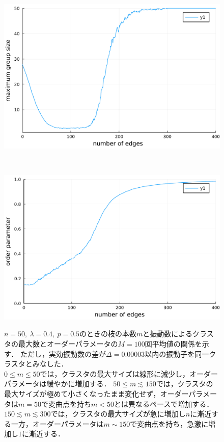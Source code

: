 \documentclass[../main]{subfiles}
\begin{document}
\begin{figure}[tbp]
    \begin{minipage}[b]{\linewidth}
      \centering
      \includegraphics[keepaspectratio, scale=0.5]{images/edge-finite-maxsize-delta00003400.pdf}
      \label{fig:edge-cutting-K04-maxsize}
    \end{minipage}\\
    \begin{minipage}[b]{\linewidth}
      \centering
      \includegraphics[keepaspectratio, scale=0.5]{images/edge-finite-R-delta00003400.pdf}
      \label{fig:edge-cutting-K04-R}
    \end{minipage}
    \caption{$n=50,\ \lambda=0.4,\ p=0.5$のときの枝の本数$m$と振動数によるクラスタの最大数とオーダーパラメータの$M=100$回平均値の関係を示す．
    ただし，実効振動数の差が$\Delta=0.00003$以内の振動子を同一クラスタとみなした．\\
    $0\leq m\leq 50$では，クラスタの最大サイズは線形に減少し，オーダーパラメータは緩やかに増加する．
    $50\leq m\lesssim 150$では，クラスタの最大サイズが極めて小さくなったまま変化せず，オーダーパラメータは$m=50$で変曲点を持ち$m<50$とは異なるペースで増加する．
    $150\lesssim m\lesssim 300$では，クラスタの最大サイズが急に増加し$n$に漸近する一方，オーダーパラメータは$m\sim 150$で変曲点を持ち，急激に増加し$1$に漸近する．
    }
    \label{fig:edge-cutting-K04}
\end{figure}
\end{document}
